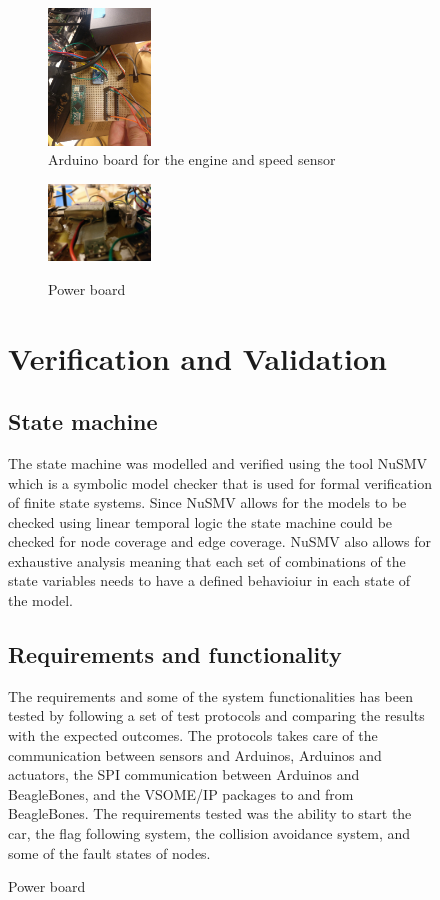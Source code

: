 \documentclass[11pt, titlepage]{article} %
\begin{document}
\begin{figure}
\begin{figure}
	\includegraphics[width=0.3\textwidth]{arduino2.jpg}
	\caption{Arduino board for the engine and speed sensor}
	\label{fig:board_speed_engine}
\end{figure}

\begin{figure}
	\includegraphics[width=0.3\textwidth]{power_board.jpg}
	\label{fig:Power_board}
	\caption{Power board}
\end{figure}





\clearpage
\section{Verification and Validation}

\subsection{State machine}
The state machine was modelled and verified using the tool NuSMV which is a symbolic model checker that is used for formal verification of finite state systems. Since NuSMV allows for the models to be checked using linear temporal logic the state machine could be checked for node coverage and edge coverage. NuSMV also allows for exhaustive analysis meaning that each set of combinations of the state variables needs to have a defined behavioiur in each state of the model.

\subsection{Requirements and functionality}
The requirements and some of the system functionalities has been tested by following a set of test protocols and comparing the results with the expected outcomes. The protocols takes care of the communication between sensors and Arduinos, Arduinos and actuators, the SPI communication between Arduinos and BeagleBones, and the VSOME/IP packages to and from BeagleBones. The requirements tested was the ability to start the car, the flag following system, the collision avoidance system, and some of the fault states of nodes.


\end{figure}
\end{document}
